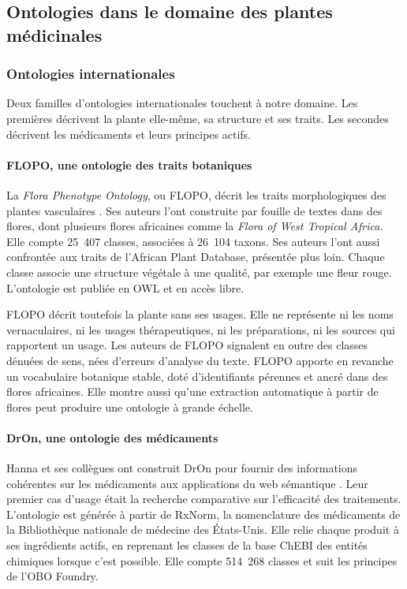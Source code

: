 \subsection{Ontologies dans le domaine des plantes médicinales}
\label{subsec:ontologies_plantes}

\subsubsection{Ontologies internationales}
\label{subsubsec:ontologies_internationales}

Deux familles d'ontologies internationales touchent à notre domaine. Les premières décrivent la plante elle-même, sa structure et ses traits. Les secondes décrivent les médicaments et leurs principes actifs.

\paragraph{FLOPO, une ontologie des traits botaniques}

La \textit{Flora Phenotype Ontology}, ou FLOPO, décrit les traits morphologiques des plantes vasculaires \cite{hoehndorf2016flopo}. Ses auteurs l'ont construite par fouille de textes dans des flores, dont plusieurs flores africaines comme la \textit{Flora of West Tropical Africa}. Elle compte 25~407 classes, associées à 26~104 taxons. Ses auteurs l'ont aussi confrontée aux traits de l'African Plant Database, présentée plus loin. Chaque classe associe une structure végétale à une qualité, par exemple une fleur rouge. L'ontologie est publiée en OWL et en accès libre.

FLOPO décrit toutefois la plante sans ses usages. Elle ne représente ni les noms vernaculaires, ni les usages thérapeutiques, ni les préparations, ni les sources qui rapportent un usage. Les auteurs de FLOPO signalent en outre des classes dénuées de sens, nées d'erreurs d'analyse du texte. FLOPO apporte en revanche un vocabulaire botanique stable, doté d'identifiants pérennes et ancré dans des flores africaines. Elle montre aussi qu'une extraction automatique à partir de flores peut produire une ontologie à grande échelle.

\paragraph{DrOn, une ontologie des médicaments}

Hanna et ses collègues ont construit DrOn pour fournir des informations cohérentes sur les médicaments aux applications du web sémantique \cite{hanna2013dron}. Leur premier cas d'usage était la recherche comparative sur l'efficacité des traitements. L'ontologie est générée à partir de RxNorm, la nomenclature des médicaments de la Bibliothèque nationale de médecine des États-Unis. Elle relie chaque produit à ses ingrédients actifs, en reprenant les classes de la base ChEBI des entités chimiques lorsque c'est possible. Elle compte 514~268 classes et suit les principes de l'OBO Foundry.

